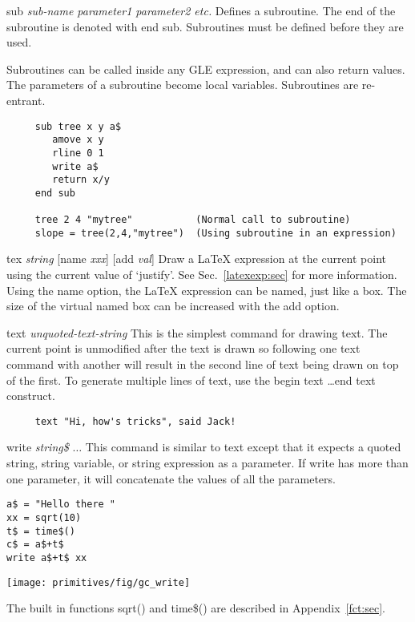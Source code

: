\begin{commanddescription}
\item[{\sf sub {\it sub-name parameter1 parameter2 etc.}}]
 Defines a subroutine. The end of the subroutine
is denoted with {\sf end sub}.  Subroutines must
be defined before they are used.

Subroutines can be called inside any GLE expression, and can
also return values.  The parameters of a subroutine become local variables.
Subroutines are re-entrant.

\begin{Verbatim}
     sub tree x y a$
        amove x y
        rline 0 1
        write a$
        return x/y
     end sub

     tree 2 4 "mytree"           (Normal call to subroutine)
     slope = tree(2,4,"mytree")  (Using subroutine in an expression)
\end{Verbatim}

\item[{\sf tex {\it string} [name {\it xxx}] [add {\it val}]}]
Draw a \LaTeX{} expression at the current point using the current value of `justify'. See Sec.~\ref{latexexp:sec} for more information. Using the {\sf name} option, the \LaTeX{} expression can be named, just like a box. The size of the virtual named box can be increased with the {\sf add} option.

\item[{\sf text {\it unquoted-text-string}}]
  This is the simplest command for drawing text.  The current point
is unmodified after the text is drawn so following one text command
with another will result in the second line of text being drawn on
top of the first.
To generate multiple lines of text, use the {\sf begin text} \ldots {\sf  end
text} construct.

\preglecode{}
\begin{Verbatim}
     text "Hi, how's tricks", said Jack!
\end{Verbatim}
\postglecode{}

\item[{\sf write {\it string\$} $\ldots$}]
 This command is similar to {\sf text} except that it expects a quoted string,
string variable, or string expression as a parameter. If write has more than one parameter, it will concatenate the values of all the parameters.

\begin{minipage}[c]{8cm}
\begin{Verbatim}
a$ = "Hello there "
xx = sqrt(10)
t$ = time$()
c$ = a$+t$ 
write a$+t$ xx
\end{Verbatim}
\end{minipage}
\hfill
\begin{minipage}[c]{7cm}
\mbox{\texttt{[image: primitives/fig/gc\_write]}}
\end{minipage}

The built in functions {\sf sqrt()} and {\sf time\$()} are described in
Appendix~\ref{fct:sec}.

\end{commanddescription}

